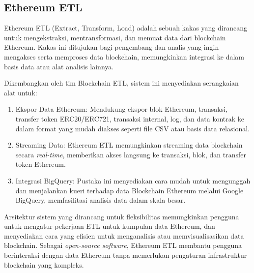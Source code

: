 \subsection{Ethereum ETL}
\label{subsec:ethereum-etl}

Ethereum ETL (Extract, Transform, Load) adalah sebuah kakas yang dirancang untuk mengekstraksi, mentransformasi, dan memuat data dari blockchain Ethereum. Kakas ini ditujukan bagi pengembang dan analis yang ingin mengakses serta memproses data blockchain, memungkinkan integrasi ke dalam basis data atau alat analisis lainnya.

Dikembangkan oleh tim Blockchain ETL, sistem ini menyediakan serangkaian alat untuk:

\begin{enumerate}
	\item Ekspor Data Ethereum: Mendukung ekspor blok Ethereum, transaksi, transfer token ERC20/ERC721, transaksi internal, log, dan data kontrak ke dalam format yang mudah diakses seperti file CSV atau basis data relasional.
	\item Streaming Data: Ethereum ETL memungkinkan streaming data blockchain secara \textit{real-time}, memberikan akses langsung ke transaksi, blok, dan transfer token Ethereum.
	\item Integrasi BigQuery: Pustaka ini menyediakan cara mudah untuk mengunggah dan menjalankan kueri terhadap data Blockchain Ethereum melalui Google BigQuery, memfasilitasi analisis data dalam skala besar.
\end{enumerate}

Arsitektur sistem yang dirancang untuk fleksibilitas memungkinkan pengguna untuk mengatur pekerjaan ETL untuk kumpulan data Ethereum, dan menyediakan cara yang efisien untuk menganalisis atau memvisualisasikan data blockchain. Sebagai \textit{open-source software}, Ethereum ETL membantu pengguna berinteraksi dengan data Ethereum tanpa memerlukan pengaturan infrastruktur blockchain yang kompleks. \parencite{ethereum_etl}